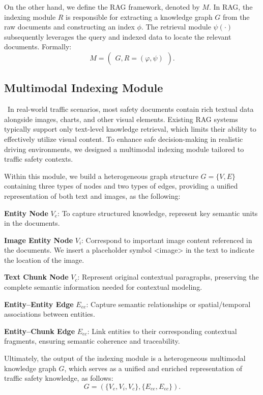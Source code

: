 \documentclass[sigconf]{acmart}
\begin{document}
On the other hand, we define the RAG framework, denoted by $M$. In RAG, the indexing module $R$ is responsible for extracting a knowledge graph $G$  from the raw documents and constructing an index $\phi$. The retrieval module $\psi(\cdot)$ subsequently leverages the query and indexed data to locate the relevant documents. Formally:
\begin{equation}{M}=\begin{pmatrix}{G},{R}=(\varphi,\psi)\end{pmatrix}.\end{equation}

\subsection{Multimodal Indexing Module}~In real-world traffic scenarios, most safety documents contain rich textual data alongside images, charts, and other visual elements. Existing RAG systems typically support only text-level knowledge retrieval, which limits their ability to effectively utilize visual content. To enhance safe decision-making in realistic driving environments, we designed a multimodal indexing module tailored to traffic safety contexts.

Within this module, we build a heterogeneous graph structure ${G=\{V,E\}}$ containing three types of nodes and two types of edges, providing a unified representation of both text and images, as the following:

\noindent\textbf{Entity Node} ${V}_{e}$: To capture structured knowledge, represent key semantic units in the documents.

\noindent\textbf{Image Entity Node} ${V}_{i}$: Correspond to important image content referenced in the documents. We insert a placeholder symbol \mbox{<image>} in the text to indicate the location of the image.

\noindent\textbf{Text Chunk Node} ${V}_{c}$: Represent original contextual paragraphs, preserving the complete semantic information needed for contextual modeling.

\noindent\textbf{Entity–Entity Edge} ${E}_{ee}$: Capture semantic relationships or spatial/temporal associations between entities.

\noindent\textbf{Entity–Chunk Edge} ${E}_{ec}$: Link entities to their corresponding contextual fragments, ensuring semantic coherence and traceability.

Ultimately, the output of the indexing module is a heterogeneous multimodal knowledge graph ${G}$, which serves as a unified and enriched representation of traffic safety knowledge, as follows:
\begin{equation}
    {G}=(\{{V}_e,{V}_i,{V}_c\},\{{E}_{ee},{E}_{ec}\}).
\end{equation}
\end{document}

